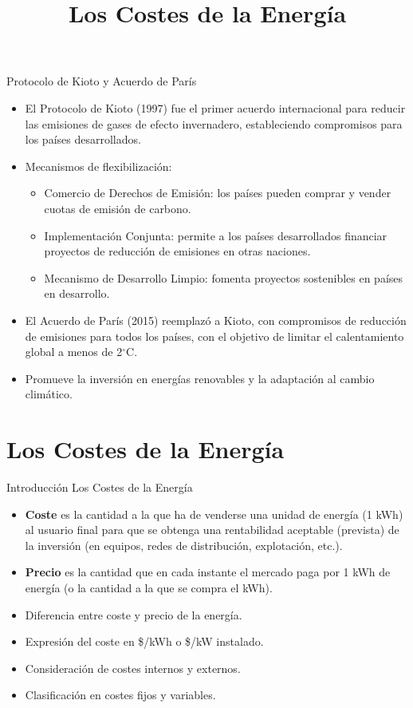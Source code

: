 \documentclass[main.tex]{subfiles}
\begin{document}
\begin{frame}{Protocolo de Kioto y Acuerdo de París}
    \begin{itemize}
        \item El Protocolo de Kioto (1997) fue el primer acuerdo internacional para reducir las emisiones de gases de efecto invernadero, estableciendo compromisos para los países desarrollados.
        \item Mecanismos de flexibilización:
        \begin{itemize}
            \item Comercio de Derechos de Emisión: los países pueden comprar y vender cuotas de emisión de carbono.
            \item Implementación Conjunta: permite a los países desarrollados financiar proyectos de reducción de emisiones en otras naciones.
            \item Mecanismo de Desarrollo Limpio: fomenta proyectos sostenibles en países en desarrollo.
        \end{itemize}
        \item El Acuerdo de París (2015) reemplazó a Kioto, con compromisos de reducción de emisiones para todos los países, con el objetivo de limitar el calentamiento global a menos de 2$^{\circ}$C.
        \item Promueve la inversión en energías renovables y la adaptación al cambio climático.
    \end{itemize}
\end{frame}


\section{Los Costes de la Energía}
\title{Los Costes de la Energía}

\begin{frame}{Introducción Los Costes de la Energía}
\begin{itemize}
    \item \textbf{Coste} es la cantidad a la que ha de venderse una unidad de energía (1 kWh) al usuario final para que se obtenga una rentabilidad aceptable (prevista) de la inversión (en equipos, redes de distribución, explotación, etc.).
    \item \textbf{Precio} es la cantidad que en cada instante el mercado paga por 1 kWh de energía (o la
cantidad a la que se compra el kWh).
\end{itemize}


    \begin{itemize}
        \item Diferencia entre coste y precio de la energía.
        \item Expresión del coste en \$/kWh o \$/kW instalado.
        \item Consideración de costes internos y externos.
        \item Clasificación en costes fijos y variables.
    \end{itemize}
\end{frame}
\end{document}
